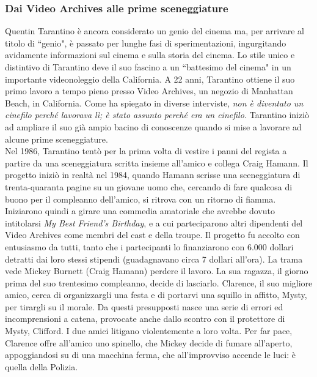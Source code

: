 \documentclass[12pt]{article} %
\begin{document}
\subsubsection{Dai Video Archives alle prime sceneggiature}
\begin{flushleft}
    Quentin Tarantino è ancora considerato un genio del cinema ma, per arrivare al titolo di ``genio", è passato per lunghe fasi di sperimentazioni, ingurgitando avidamente informazioni sul cinema e sulla storia del cinema.
    Lo stile unico e distintivo di Tarantino deve il suo fascino a un ``battesimo del cinema" in un importante videonoleggio della California.
    A 22 anni, Tarantino ottiene il suo primo lavoro a tempo pieno presso Video Archives, un negozio di Manhattan Beach, in California. Come ha spiegato in diverse interviste, \textit{non è diventato un cinefilo perché lavorava lì; è stato assunto perché era un cinefilo.} 
    Tarantino iniziò ad ampliare il suo già ampio bacino di conoscenze quando si mise a lavorare ad alcune prime sceneggiature.\\\vspace{1cm}
    Nel 1986, Tarantino tentò per la prima volta di vestire i panni del regista a partire da una sceneggiatura scritta insieme all'amico e collega Craig Hamann. Il progetto iniziò in realtà nel 1984, quando Hamann scrisse una sceneggiatura di trenta-quaranta pagine su un giovane uomo che, cercando di fare qualcosa di buono per il compleanno dell'amico, si ritrova con un ritorno di fiamma.
    Iniziarono quindi a girare una commedia amatoriale che avrebbe dovuto intitolarsi \textit{My Best Friend's Birthday}, e a cui parteciparono altri dipendenti del Video Archives come membri del cast e della troupe. Il progetto fu accolto con entusiasmo da tutti, tanto che i partecipanti lo finanziarono con 6.000 dollari detratti dai loro stessi stipendi (guadagnavano circa 7 dollari all'ora).
    La trama vede Mickey Burnett (Craig Hamann) perdere il lavoro. La sua ragazza, il giorno prima del suo trentesimo compleanno, decide di lasciarlo. Clarence, il suo migliore amico, cerca di organizzargli una festa e di portarvi una squillo in affitto, Mysty, per tirargli su il morale.
    Da questi presupposti nasce una serie di errori ed incomprensioni a catena, provocate anche dallo scontro con il protettore di Mysty, Clifford. I due amici litigano violentemente a loro volta. Per far pace, Clarence offre all'amico uno spinello, che Mickey decide di fumare all'aperto, appoggiandosi su di una macchina ferma, che all'improvviso accende le luci: è quella della Polizia.

\end{flushleft}
\end{document}
